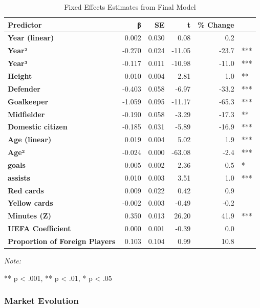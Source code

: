\documentclass[
  12pt,
]{article}
\begin{document}
\begin{table}[H]
\centering
\caption{Fixed Effects Estimates from Final Model}
\centering
\fontsize{11}{13}\selectfont
\begin{threeparttable}
\begin{tabular}[t]{>{}l|r|r|r|r|l}
\hline
Predictor & β & SE & t & \% Change & \\
\hline
\textbf{Year (linear)} & 0.002 & 0.030 & 0.08 & 0.2 & \\
\textbf{Year²} & -0.270 & 0.024 & -11.05 & -23.7 & ***\\
\textbf{Year³} & -0.117 & 0.011 & -10.98 & -11.0 & ***\\
\textbf{Height} & 0.010 & 0.004 & 2.81 & 1.0 & **\\
\textbf{Defender} & -0.403 & 0.058 & -6.97 & -33.2 & ***\\
\textbf{Goalkeeper} & -1.059 & 0.095 & -11.17 & -65.3 & ***\\
\textbf{Midfielder} & -0.190 & 0.058 & -3.29 & -17.3 & **\\
\textbf{Domestic citizen} & -0.185 & 0.031 & -5.89 & -16.9 & ***\\
\textbf{Age (linear)} & 0.019 & 0.004 & 5.02 & 1.9 & ***\\
\textbf{Age²} & -0.024 & 0.000 & -63.08 & -2.4 & ***\\
\textbf{goals} & 0.005 & 0.002 & 2.36 & 0.5 & *\\
\textbf{assists} & 0.010 & 0.003 & 3.51 & 1.0 & ***\\
\textbf{Red cards} & 0.009 & 0.022 & 0.42 & 0.9 & \\
\textbf{Yellow cards} & -0.002 & 0.003 & -0.49 & -0.2 & \\
\textbf{Minutes (Z)} & 0.350 & 0.013 & 26.20 & 41.9 & ***\\
\textbf{UEFA Coefficient} & 0.000 & 0.001 & -0.39 & 0.0 & \\
\textbf{Proportion of Foreign Players} & 0.103 & 0.104 & 0.99 & 10.8 & \\
\hline
\end{tabular}
\begin{tablenotes}[para]
\item \textit{Note: } 
\item *** p < .001, ** p < .01, * p < .05
\end{tablenotes}
\end{threeparttable}
\end{table}

\subsubsection{Market Evolution}\label{market-evolution}
\end{document}
